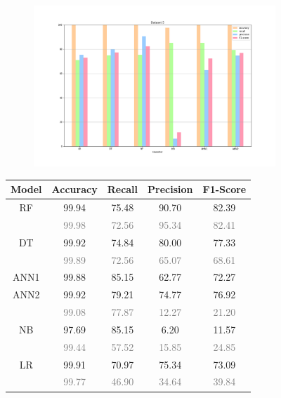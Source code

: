 \documentclass{Configuration_Files/PoliMi3i_thesis}
\begin{document}
\begin{figure}[H]
\centering
\begin{subfigure}
    \centering
    \includegraphics[scale=0.3]{Images/Dataset_5.png}
\end{subfigure}

\renewcommand{\arraystretch}{0.8}%
\begin{table}[H]
\centering 
    \begin{tabular}{ c  c  c  c  c }
    \hline 
    \textbf{Model}  & \textbf{Accuracy} & \textbf{Recall} & \textbf{Precision} & \textbf{F1-Score} \\
    \hline
    RF	& 99.94 &	75.48 &	90.70 &	82.39 \\
        & \footnotesize\textcolor{gray}{99.98} & \footnotesize\textcolor{gray}{72.56} & \footnotesize\textcolor{gray}{95.34} & \footnotesize\textcolor{gray}{82.41} \\[0.01cm]
    DT	& 99.92 &	74.84 &	80.00 &	77.33 \\
        & \footnotesize\textcolor{gray}{99.89} & \footnotesize\textcolor{gray}{72.56} & \footnotesize\textcolor{gray}{65.07} & \footnotesize\textcolor{gray}{68.61} \\
    ANN1 & 99.88 & 85.15 & 62.77 & 72.27 \\
    ANN2 & 99.92 & 79.21 & 74.77 & 76.92 \\
         & \footnotesize\textcolor{gray}{99.08} & \footnotesize\textcolor{gray}{77.87} & \footnotesize\textcolor{gray}{12.27} & \footnotesize\textcolor{gray}{21.20} \\
    NB	& 97.69 &	85.15 &	6.20 &	11.57 \\
        & \footnotesize\textcolor{gray}{99.44} & \footnotesize\textcolor{gray}{57.52} & \footnotesize\textcolor{gray}{15.85} & \footnotesize\textcolor{gray}{24.85} \\
    LR	& 99.91 &	70.97 &	75.34 &	73.09 \\
        & \footnotesize\textcolor{gray}{99.77} & \footnotesize\textcolor{gray}{46.90} & \footnotesize\textcolor{gray}{34.64} & \footnotesize\textcolor{gray}{39.84} \\
    \hline
    \end{tabular}
\end{table}


\end{figure}
\end{document}
